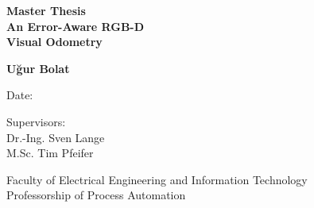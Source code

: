 \documentclass[a4paper]{report}
\numberwithin{figure}{section}
\begin{document}
\begin{titlepage}
\begin{center}


\vspace{1.5cm}


{\Huge \textbf{Master Thesis}}\\
\vspace{0.5cm}
{\huge \textbf{An Error-Aware RGB-D \\Visual Odometry}}


\vspace{2.5cm}

{\huge \textbf{U\u{g}ur Bolat}}

\vfill

Date:

\vspace{1.2cm}

Supervisors: \\
Dr.-Ing. Sven Lange \\
M.Sc. Tim Pfeifer

\vspace{0.8cm}

Faculty of Electrical Engineering and Information Technology\\
Professorship of Process Automation

\end{center}
\end{titlepage}
\end{document}
